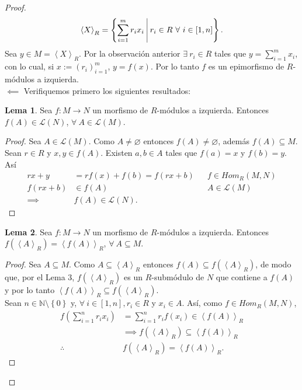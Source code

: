 \documentclass{article}
\newcommand{\lrprth}[1]{
	\left(#1\right)
}
\newcommand{\lrbrack}[1]{
	\left\{#1\right\}
}
\newcommand{\fntuple}[3]{
	{\left({#1}_{#2}\right)}_{#2=1}^{#3}
}
\newcommand{\genmod}[2]{
	\left< #1\right>_{#2}
}
\newcommand{\genlin}[1]{
	\mathscr{L}\lrprth{#1}
}
\newcommand{\ringmodhom}[3]{
	Hom_{#1}\lrprth{#2,#3}
}
\theoremstyle{definition}
\theoremstyle{plain}
\theoremstyle{plain}
\theoremstyle{definition}
\theoremstyle{definition}
\theoremstyle{definition}
\theoremstyle{definition}
\theoremstyle{definition}
\newtheorem{lem}{Lema}
\theoremstyle{definition}
\begin{document}
\begin{enumerate}[label=\textbf{Ej \arabic*.}]
\begin{proof}
	\begin{equation*}
		\genmod{X}{R}=\lrbrack{\sum_{i=1}^mr_ix_i\ \vline\ r_i\in R\ \forall\ i\in[1,n]}.
	\end{equation*}
	Sea $y\in M=\genmod{X}{R}$. Por la observación anterior $\exists\ r_i\in R$ tales que $y=\sum_{i=1}^{m}x_i$, con lo cual, si $x:=\fntuple{r}{i}{m}$, $y=f(x)$. Por lo tanto $f$ es un epimorfismo de $R$-módulos a izquierda.\\
	$\boxed{\impliedby}$ Verifiquemos primero los siguientes resultados:
	\begin{lem}
		Sea $f:M\rightarrow N$ un morfismo de $R$-módulos a izquierda. Entonces $f\lrprth{A}\in\genlin{N}$, $\forall\ A\in\genlin{M}$.
	\end{lem}
	\begin{proof}
		Sea $A\in \genlin{M}$. Como $A\neq\varnothing$ entonces $f\lrprth{A}\neq\varnothing$, además $f(A)\subseteq M$. Sean $r\in R$ y $x,y\in f(A)$. Existen $a,b\in A$ tales que $f(a)=x$ y $f(b)=y$. Así
		\begin{align*}
			rx+y&=rf(x)+f(b)=f(rx+b) && f\in\ringmodhom{R}{M}{N}\\
			f(rx+b)&\in f\lrprth{A} && A\in\genlin{M}\\
			\implies & f(A)\in\genlin{N}.
		\end{align*}
	\end{proof}
	\begin{lem}
	Sea $f:M\rightarrow N$ un morfismo de $R$-módulos a izquierda. Entonces $f\lrprth{\genmod{A}{R}}=\genmod{f\lrprth{A}}{R}$, $\forall\ A\subseteq M$.
	\end{lem}
	\begin{proof}
		Sea $A\subseteq M$. Como $A\subseteq\genmod{A}{R}$ entonces $f\lrprth{A}\subseteq f\lrprth{\genmod{A}{R}}$, de modo que, por el Lema 3, $f\lrprth{\genmod{A}{R}}$ es un $R$-submódulo de $N$ que contiene a $f(A)$ y por lo tanto $\genmod{f(A)}{R}\subseteq f\lrprth{\genmod{A}{R}}$.\\
		Sean $n\in\mathbb{N}\setminus\lrbrack{0}$ y, $\forall\ i\in[1,n], r_i\in R$ y $x_i\in A$. Así, como $f\in\ringmodhom{R}{M}{N}$,
		\begin{align*}
			f\lrprth{\sum_{i=1}^{n}r_ix_i}&=\sum_{i=1}^{n}r_i f(x_i)\in\genmod{f(A)}{R}\\
			 & \implies f\lrprth{\genmod{A}{R}} \subseteq \genmod{f(A)}{R}\\
			 \therefore\ & f\lrprth{\genmod{A}{R}} = \genmod{f(A)}{R}.
		\end{align*}

\end{proof}
\end{proof}
\end{enumerate}
\end{document}
